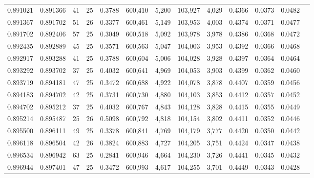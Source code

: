 \begin{tabular}{rrrrrrrrrrrrr}
0.891021 & 0.891366 &    41 &  25 &                                     0.3788 & 600,410 &   5,200 & 103,927 &   4,029 & 0.4366 & 0.0373 & 0.0482 \\
0.891367 & 0.891702 &    51 &  26 &                                     0.3377 & 600,461 &   5,149 & 103,953 &   4,003 & 0.4374 & 0.0371 & 0.0477 \\
0.891702 & 0.892406 &    57 &  25 &                                     0.3049 & 600,518 &   5,092 & 103,978 &   3,978 & 0.4386 & 0.0368 & 0.0472 \\
0.892435 & 0.892889 &    45 &  25 &                                     0.3571 & 600,563 &   5,047 & 104,003 &   3,953 & 0.4392 & 0.0366 & 0.0468 \\
0.892917 & 0.893288 &    41 &  25 &                                     0.3788 & 600,604 &   5,006 & 104,028 &   3,928 & 0.4397 & 0.0364 & 0.0464 \\
0.893292 & 0.893702 &    37 &  25 &                                     0.4032 & 600,641 &   4,969 & 104,053 &   3,903 & 0.4399 & 0.0362 & 0.0460 \\
0.893719 & 0.894181 &    47 &  25 &                                     0.3472 & 600,688 &   4,922 & 104,078 &   3,878 & 0.4407 & 0.0359 & 0.0456 \\
0.894183 & 0.894702 &    42 &  25 &                                     0.3731 & 600,730 &   4,880 & 104,103 &   3,853 & 0.4412 & 0.0357 & 0.0452 \\
0.894702 & 0.895212 &    37 &  25 &                                     0.4032 & 600,767 &   4,843 & 104,128 &   3,828 & 0.4415 & 0.0355 & 0.0449 \\
0.895214 & 0.895487 &    25 &  26 &                                     0.5098 & 600,792 &   4,818 & 104,154 &   3,802 & 0.4411 & 0.0352 & 0.0446 \\
0.895500 & 0.896111 &    49 &  25 &                                     0.3378 & 600,841 &   4,769 & 104,179 &   3,777 & 0.4420 & 0.0350 & 0.0442 \\
0.896118 & 0.896504 &    42 &  26 &                                     0.3824 & 600,883 &   4,727 & 104,205 &   3,751 & 0.4424 & 0.0347 & 0.0438 \\
0.896534 & 0.896942 &    63 &  25 &                                     0.2841 & 600,946 &   4,664 & 104,230 &   3,726 & 0.4441 & 0.0345 & 0.0432 \\
0.896944 & 0.897401 &    47 &  25 &                                     0.3472 & 600,993 &   4,617 & 104,255 &   3,701 & 0.4449 & 0.0343 & 0.0428 \\

\end{tabular}
